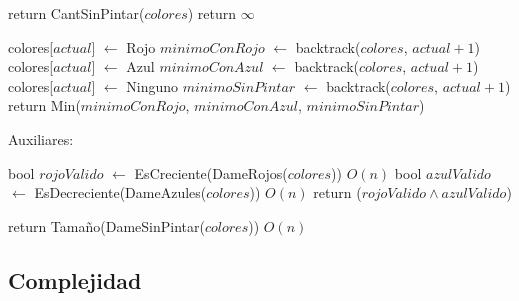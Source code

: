 \begin{algorithm}
\begin{algorithmic}


    \State return CantSinPintar($colores$)
  \Else
    \State return $\infty$
  \EndIf

\Else

  \State colores[$actual$] $\gets$ Rojo
  \State $minimoConRojo$ $\gets$ backtrack($colores$, $actual + 1$) \\

  \State colores[$actual$] $\gets$ Azul
  \State $minimoConAzul$ $\gets$ backtrack($colores$, $actual + 1$) \\

  \State colores[$actual$] $\gets$ Ninguno
  \State $minimoSinPintar$ $\gets$ backtrack($colores$, $actual + 1$) \\

  \State return Min($minimoConRojo$, $minimoConAzul$, $minimoSinPintar$)

\EndIf
\EndProcedure
\end{algorithmic}
\end{algorithm}


Auxiliares:

\begin{algorithm}
\begin{algorithmic}

    \State bool $rojoValido$ $\gets$ EsCreciente(DameRojos($colores$))  \Comment $O(n)$
    \State bool $azulValido$ $\gets$ EsDecreciente(DameAzules($colores$)) \Comment $O(n)$
    \State return ($rojoValido \land azulValido$)

\EndProcedure
\end{algorithmic}
\end{algorithm}


\begin{algorithm}
\begin{algorithmic}
    \State return Tamaño(DameSinPintar($colores$))  \Comment $O(n)$
\EndProcedure
\end{algorithmic}
\end{algorithm}


\subsection{Complejidad}

